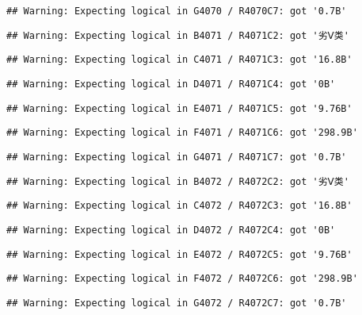 \documentclass[
]{article}
\begin{document}
\begin{verbatim}
## Warning: Expecting logical in G4070 / R4070C7: got '0.7B'
\end{verbatim}

\begin{verbatim}
## Warning: Expecting logical in B4071 / R4071C2: got '劣Ⅴ类'
\end{verbatim}

\begin{verbatim}
## Warning: Expecting logical in C4071 / R4071C3: got '16.8B'
\end{verbatim}

\begin{verbatim}
## Warning: Expecting logical in D4071 / R4071C4: got '0B'
\end{verbatim}

\begin{verbatim}
## Warning: Expecting logical in E4071 / R4071C5: got '9.76B'
\end{verbatim}

\begin{verbatim}
## Warning: Expecting logical in F4071 / R4071C6: got '298.9B'
\end{verbatim}

\begin{verbatim}
## Warning: Expecting logical in G4071 / R4071C7: got '0.7B'
\end{verbatim}

\begin{verbatim}
## Warning: Expecting logical in B4072 / R4072C2: got '劣Ⅴ类'
\end{verbatim}

\begin{verbatim}
## Warning: Expecting logical in C4072 / R4072C3: got '16.8B'
\end{verbatim}

\begin{verbatim}
## Warning: Expecting logical in D4072 / R4072C4: got '0B'
\end{verbatim}

\begin{verbatim}
## Warning: Expecting logical in E4072 / R4072C5: got '9.76B'
\end{verbatim}

\begin{verbatim}
## Warning: Expecting logical in F4072 / R4072C6: got '298.9B'
\end{verbatim}

\begin{verbatim}
## Warning: Expecting logical in G4072 / R4072C7: got '0.7B'
\end{verbatim}
\end{document}
